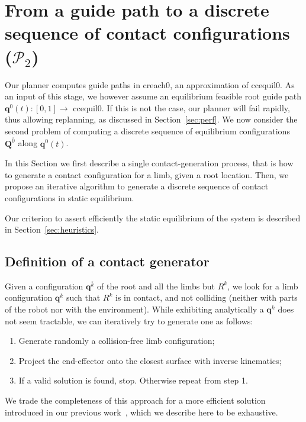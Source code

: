 \section{From a guide path to a discrete sequence of contact configurations ($\mathcal{P}_2$)}
\label{sec:contact}
Our planner computes guide paths in \gls{creach0}, an approximation of \gls{ccequil0}.
As an input of this stage, we however assume an \gls{equilibrium feasible} root guide path $\mathbf{q}^0(t) : [0,1] \longrightarrow$ \gls{ccequil0}.
If this is not the case, our planner will fail rapidly, thus allowing replanning, as discussed in Section~\ref{sec:perf}.
We now consider the second problem of computing a discrete sequence of equilibrium configurations $\mathbf{Q}^{\overline{0}}$ along $\mathbf{q}^0(t)$.

In this Section we first describe a single contact-generation process, that is how to generate a contact configuration for a limb, given a
root location.
Then, we propose an iterative algorithm to generate a discrete sequence of contact configurations in static equilibrium.

Our criterion to assert efficiently the static equilibrium of the system
is described in Section~\ref{sec:heuristics}.

\subsection{Definition of a contact generator}
\label{sec:single_contact}
Given a configuration $\mathbf{q}^{\overline{k}}$ of the root and all the limbs but $R^k$, we look for a limb configuration $\mathbf{q}^k$ such that
$R^k$ is in contact, and not colliding (neither with parts of the robot nor with the environment).
While exhibiting analytically a $\mathbf{q}^{k}$ does not seem tractable, we can iteratively try to generate one as follows:
\begin{enumerate}
\item Generate randomly a collision-free limb configuration;
\item Project the end-effector onto the closest surface with inverse kinematics;
\item If a valid solution is found, stop. Otherwise repeat from step 1.
\end{enumerate}


We trade the completeness of this approach for a more efficient solution introduced in our previous work~\citep{Tonneau2014}, which we describe
here to be exhaustive.


